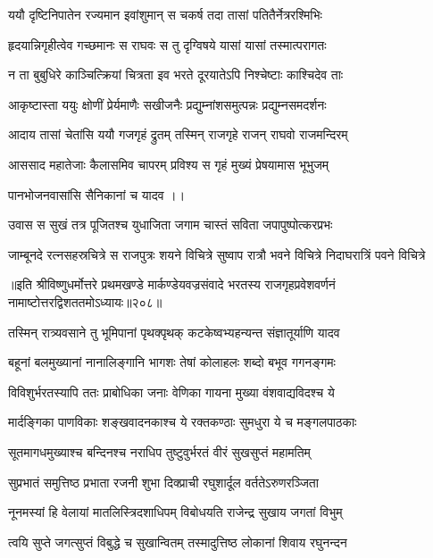 \twolineshloka
{ययौ दृष्टिनिपातेन रज्यमान इवांशुमान्}
{स चकर्ष तदा तासां पतितैर्नेत्ररश्मिभिः}%

\twolineshloka
{हृदयान्निगृहीत्वेव गच्छमानः स राघवः}
{स तु दृग्विषये यासां यासां तस्मात्परागतः}%

\twolineshloka
{न ता बुबुधिरे काञ्चित्क्रियां चित्रता इव}
{भरते दूरयातेऽपि निश्चेष्टाः काश्चिदेव ताः} %

\twolineshloka
{आकृष्टास्ता ययुः क्षोणीं प्रेर्यमाणैः सखीजनैः}
{प्रद्युम्नांशसमुत्पन्नः प्रद्युम्नसमदर्शनः}%

\twolineshloka
{आदाय तासां चेतांसि ययौ गजगृहं द्रुतम्}
{तस्मिन् राजगृहे राजन् राघवो राजमन्दिरम्}%

\twolineshloka
{आससाद महातेजाः कैलासमिव चापरम्}
{प्रविश्य स गृहं मुख्यं प्रेषयामास भूभुजम्}%

पानभोजनवासांसि सैनिकानां च यादव ।।

\twolineshloka
{उवास स सुखं तत्र पूजितश्च युधाजिता}
{जगाम चास्तं सविता जपापुष्पोत्करप्रभः}%

\twolineshloka
{जाम्बूनदे रत्नसहस्रचित्रे स राजपुत्रः शयने विचित्रे}
{सुष्वाप रात्रौ भवने विचित्रे निदाघरात्रिं पवने विचित्रे}%

॥इति श्रीविष्णुधर्मोत्तरे प्रथमखण्डे मार्कण्डेयवज्रसंवादे भरतस्य राजगृहप्रवेशवर्णनं नामाष्टोत्तरद्विशततमोऽध्यायः॥२०८॥



\twolineshloka
{तस्मिन् रात्र्यवसाने तु भूमिपानां पृथक्पृथक्}
{कटकेष्वभ्यहन्यन्त संज्ञातूर्याणि यादव}%

\twolineshloka
{बहूनां बलमुख्यानां नानालिङ्गानि भागशः}
{तेषां कोलाहलः शब्दो बभूव गगनङ्गमः}%

\twolineshloka
{विविशुर्भरतस्यापि ततः प्राबोधिका जनाः}
{वेणिका गायना मुख्या वंशवाद्यविदश्च ये}%

\twolineshloka
{मार्दङ्गिका पाणविकाः शङ्खवादनकाश्च ये}
{रक्तकण्ठाः सुमधुरा ये च मङ्गलपाठकाः}%

\twolineshloka
{सूतमागधमुख्याश्च बन्दिनश्च नराधिप}
{तुष्टुवुर्भरतं वीरं सुखसुप्तं महामतिम्}%

\twolineshloka
{सुप्रभातं समुत्तिष्ठ प्रभाता रजनी शुभा}
{दिक्प्राची रघुशार्दूल वर्ततेऽरुणरञ्जिता}%

\twolineshloka
{नूनमस्यां हि वेलायां मातलिस्त्रिदशाधिपम्}
{विबोधयति राजेन्द्र सुखाय जगतां विभुम्}%

\twolineshloka
{त्वयि सुप्ते जगत्सुप्तं विबुद्धे च सुखान्वितम्}
{तस्मादुत्तिष्ठ लोकानां शिवाय रघुनन्दन}%

